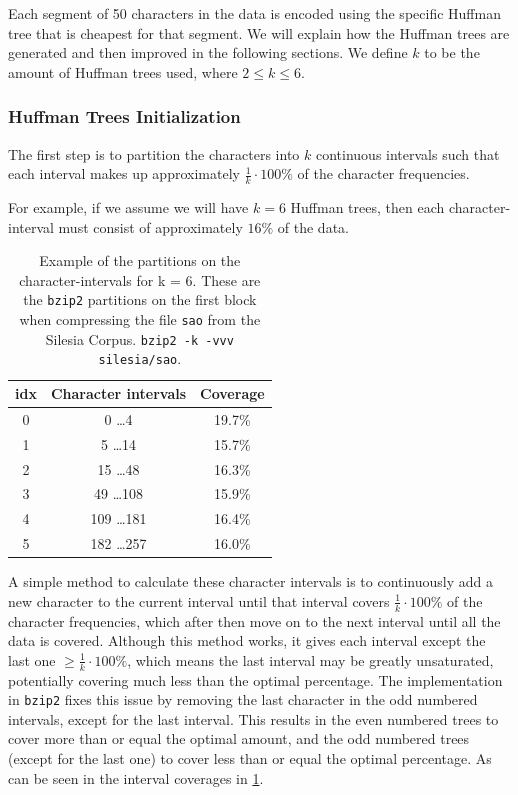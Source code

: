 \documentclass{article}
\begin{document}
Each segment of 50 characters in the data is encoded using the specific Huffman tree that is cheapest for that segment. We will explain how the Huffman trees are generated and then improved in the following sections. We define \(k\) to be the amount of Huffman trees used, where \(2 \leq k \leq 6\).

\subsubsection{Huffman Trees Initialization}\label{HuffmanTreeInit}
The first step is to partition the characters into \(k\) continuous intervals such that each interval makes up approximately \(\frac{1}{k} \cdot 100\%\) of the character frequencies.

For example, if we assume we will have \(k = 6\) Huffman trees, then each character-interval must consist of approximately \(16\%\) of the data. 
\begin{table}[H]
    \centering
    \begin{tabular}{|c|c|c|}
        \hline
        idx & Character intervals & Coverage \\\hline
        0 & 0 \dots 4 & 19.7\% \\ \hline
        1 & 5 \dots 14 & 15.7\% \\ \hline
        2 & 15 \dots 48 & 16.3\% \\ \hline
        3 & 49 \dots 108 & 15.9\% \\ \hline
        4 & 109 \dots 181 & 16.4\% \\ \hline
        5 & 182 \dots 257 & 16.0\% \\  \hline
    \end{tabular}
    \caption{Example of the partitions on the character-intervals for k = 6. These are the \texttt{bzip2} partitions on the first block when compressing the file \texttt{sao} from the Silesia Corpus. \texttt{bzip2 -k -vvv silesia/sao}.}
    \label{table:tableIntervalPartition}
\end{table}
A simple method to calculate these character intervals is to continuously add a new character to the current interval until that interval covers \(\frac{1}{k} \cdot 100\%\) of the character frequencies, which after then move on to the next interval until all the data is covered. Although this method works, it gives each interval except the last one \(\geq \frac{1}{k} \cdot 100\%\), which means the last interval may be greatly unsaturated, potentially covering much less than the optimal percentage. 
The implementation in \texttt{bzip2} fixes this issue by removing the last character in the odd numbered intervals, except for the last interval. This results in the even numbered trees to cover more than or equal the optimal amount, and the odd numbered trees (except for the last one) to cover less than or equal the optimal percentage. As can be seen in the interval coverages in \cref{table:tableIntervalPartition}.
\end{document}
